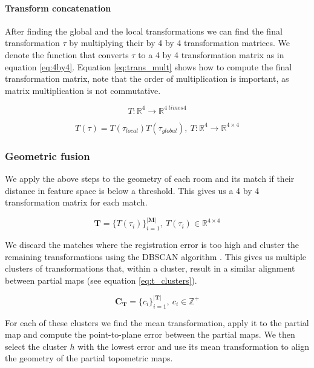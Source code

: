 \paragraph{Transform concatenation}
After finding the global and the local transformations we can find the final transformation \(\tau\) by multiplying their by 4 by 4 transformation matrices. We denote the function that converts \(\tau\) to a 4 by 4 transformation matrix as in equation \ref{eq:4by4}. Equation \ref{eq:trans_mult} shows how to compute the final transformation matrix, note that the order of multiplication is important, as matrix multiplication is not commutative.

\begin{equation}
    \label{eq:4by4}
    T: \mathbb{R}^4 \rightarrow \mathbb{R}^{4 \ times 4}
\end{equation}

\begin{equation}
    \label{eq:trans_mult}
    T(\tau) = T(\tau_{local})T(\tau_{global}),\ T: \mathbb{R}^4 \rightarrow \mathbb{R}^{4 \times 4}
\end{equation}

\subsubsection{Geometric fusion}
We apply the above steps to the geometry of each room and its match if their distance in feature space is below a threshold. This gives us a 4 by 4 transformation matrix for each match.

\begin{equation}
    \label{eq:room_t}
    \mathbf{T} = \{T(\tau_i)\}_{i=1}^{|\mathbf{M}|},\ T(\tau_i) \in \mathbb{R}^{4 \times 4}
\end{equation}

We discard the matches where the registration error is too high and cluster the remaining transformations using the DBSCAN algorithm \citep{schubert_dbscan_2017}. This gives us multiple clusters of transformations that, within a cluster, result in a similar alignment between partial maps (see equation \ref{eq:t_clusters}). 

\begin{equation}
    \label{eq:t_clusters}
    \mathbf{C}_{\mathbf{T}} = \{c_i\}_{i=1}^{|\mathbf{T}|},\ c_i \in \mathbb{Z}^+
\end{equation}


For each of these clusters we find the mean transformation, apply it to the partial map and compute the point-to-plane error between the partial maps. We then select the cluster \(h\) with the lowest error and use its mean transformation to align the geometry of the partial topometric maps. 

